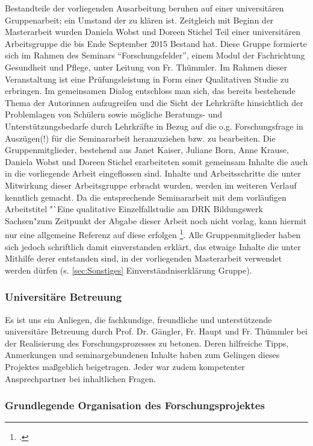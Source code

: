 Bestandteile der vorliegenden Ausarbeitung beruhen auf einer universitären Gruppenarbeit; ein Umstand der zu klären ist. Zeitgleich mit Beginn der Masterarbeit wurden Daniela Wobst und Doreen Stichel Teil einer universitären Arbeitsgruppe die bis Ende September 2015 Bestand hat. Diese Gruppe formierte sich im Rahmen des Seminars "`Forschungsfelder"', einem Modul der Fachrichtung Gesundheit und Pflege, unter Leitung von Fr. Thümmler. Im Rahmen dieser Veranstaltung ist eine Prüfungsleistung in Form einer Qualitativen Studie zu erbringen. Im gemeinsamen Dialog entschloss man sich, das bereits bestehende Thema der Autorinnen aufzugreifen und die Sicht der Lehrkräfte hinsichtlich der Problemlagen von Schülern sowie mögliche Beratungs- und Unterstützungsbedarfe durch Lehrkräfte in Bezug auf die o.g. Forschungsfrage in Auszügen(!) für die Seminararbeit heranzuziehen bzw. zu bearbeiten. Die Gruppenmitglieder, bestehend aus Janet Kaiser, Juliane Born, Anne Krause, Daniela Wobst und Doreen Stichel erarbeiteten somit gemeinsam Inhalte die auch in die vorliegende Arbeit eingeflossen sind. Inhalte und Arbeitsschritte die unter Mitwirkung dieser Arbeitsgruppe erbracht wurden, werden im weiteren Verlauf kenntlich gemacht. Da die entsprechende Seminararbeit mit dem vorläufigen Arbeitstitel "`Eine qualitative Einzelfallstudie am DRK Bildungswerk Sachsen"zum Zeitpunkt der Abgabe dieser Arbeit noch nicht vorlag, kann hiermit nur eine allgemeine Referenz auf diese erfolgen \footcite{Hemmerling2015}. Alle Gruppenmitglieder haben sich jedoch schriftlich damit einverstanden erklärt, das etwaige Inhalte die unter Mithilfe derer entstanden sind, in der vorliegenden Masterarbeit verwendet werden dürfen (s. \ref{sec:Sonstiges} Einverständniserklärung Gruppe).

\subsubsection{Universitäre Betreuung}
\label{sec:UniversitäreBetreuung}

Es ist uns ein Anliegen, die fachkundige, freundliche und unterstützende universitäre Betreuung durch Prof. Dr. Gängler, Fr. Haupt und Fr. Thümmler bei der Realisierung des Forschungsprozesses zu betonen. Deren hilfreiche Tipps, Anmerkungen und seminargebundenen Inhalte haben zum Gelingen dieses Projektes maßgeblich beigetragen. Jeder war zudem kompetenter Ansprechpartner bei inhaltlichen Fragen.

\subsubsection{Grundlegende Organisation des Forschungsprojektes}
\label{sec:GrundlegendeOrganisationDesForschungsprojektes}

